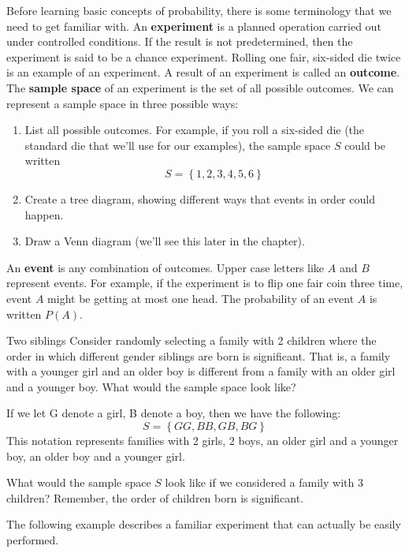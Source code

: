 \setcounter{ExampleCounter}{1}
Before learning basic concepts of probability, there is some terminology that we need to get familiar with. 
An \textbf{experiment} is a planned operation carried out under controlled conditions. If the result is not predetermined, then the
experiment is said to be a chance experiment. Rolling one fair, six-sided die twice is an example of an experiment.
A result of an experiment is called an \textbf{outcome}. The \textbf{sample space} of an experiment is the set of all possible outcomes.
We can represent a sample space in three possible ways: 
\begin{enumerate}
\item List all possible outcomes.  For example, if you roll a six-sided die (the standard die that we'll use for our examples), the sample space $S$ could be written \[S = \left\{1, 2, 3, 4, 5, 6 \right\}\]
\item Create a tree diagram, showing different ways that events in order could happen.
\item Draw a Venn diagram (we'll see this later in the chapter).
\end{enumerate}

An \textbf{event} is any combination of outcomes. Upper case letters like $A$ and $B$ represent events. For example, if the experiment
is to flip one fair coin three time, event $A$ might be getting at most one head. The probability of an event $A$ is written $P(A)$. 

\begin{example}[https://www.youtube.com/watch?v=dZda3xN2W_g]{Two siblings}
Consider randomly selecting a family with 2 children where the order in which different gender siblings are born is significant. That is, a family with a younger girl and an older boy is different from a family with an older girl and a younger boy. What would the sample space look like?

\sol
If we let G denote a girl, B denote a boy, then we have the following:
\[  S = \boxed{\left\{ GG, BB, GB, BG \right\}} \]
This notation represents families with 2 girls, 2 boys, an older girl and a younger boy, an older boy and a younger girl. 
\end{example}

\begin{try}
What would the sample space $S$ look like if we considered a family with 3 children? Remember, the order of children born is significant. 
\end{try}

The following example describes a familiar experiment that can actually be easily performed.

